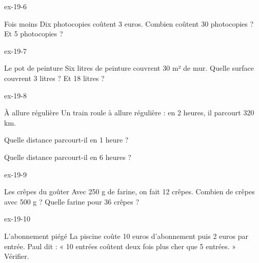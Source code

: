 \begin{blocLivre}{ex-19-6}\begin{exercice}[2]{Fois moins}
Dix photocopies coûtent 3 euros. Combien coûtent 30 photocopies ? Et 5 photocopies ?
\end{exercice}\end{blocLivre}
\begin{blocLivre}{ex-19-7}\begin{exercice}[2]{Le pot de peinture}
Six litres de peinture couvrent 30 m² de mur. Quelle surface couvrent 3 litres ? Et 18 litres ?
\end{exercice}\end{blocLivre}
\begin{blocLivre}{ex-19-8}\begin{exercice}[2]{À allure régulière}
Un train roule à allure régulière : en 2 heures, il parcourt 320 km.\begin{questions}
\item Quelle distance parcourt-il en 1 heure ?
\item Quelle distance parcourt-il en 6 heures ?
\end{questions}
\end{exercice}\end{blocLivre}
\begin{blocLivre}{ex-19-9}\begin{exercice}[2]{Les crêpes du goûter}
Avec 250 g de farine, on fait 12 crêpes. Combien de crêpes avec 500 g ? Quelle farine pour 36 crêpes ?
\end{exercice}\end{blocLivre}
\begin{blocLivre}{ex-19-10}\begin{exercice}[2]{L’abonnement piégé}
La piscine coûte 10 euros d’abonnement puis 2 euros par entrée. Paul dit : « 10 entrées coûtent deux fois plus cher que 5 entrées. » Vérifier.
\end{exercice}\end{blocLivre}


